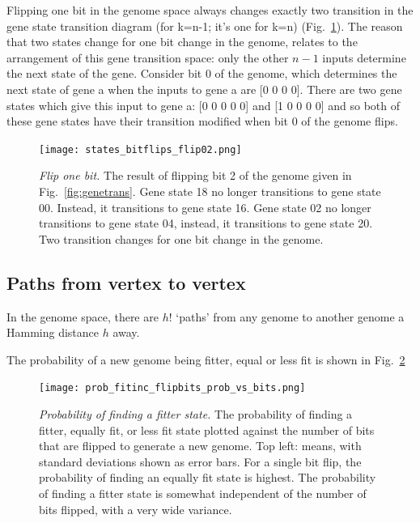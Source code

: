 \documentclass[11pt, a4paper]{article}
\begin{document}
Flipping one bit in the genome space always changes exactly two
transition in the gene state transition diagram (for k=n-1; it's one
for k=n) (Fig.~\ref{fig:genetrans2}). The reason that two states
change for one bit change in the genome, relates to the arrangement of
this gene transition space: only the other $n-1$ inputs determine the
next state of the gene. Consider bit 0 of the genome, which determines
the next state of gene a when the inputs to gene a are [0 0 0
0]. There are two gene states which give this input to gene a: [0 0 0
0 0] and [1 0 0 0 0] and so both of these gene states have their
transition modified when bit 0 of the genome flips.

\begin{figure}
\begin{center}
\texttt{[image: states\_bitflips\_flip02.png]}
\caption{\emph{Flip one bit.} The result of flipping bit 2 of the
genome given in Fig.~\ref{fig:genetrans}. Gene state 18 no longer
transitions to gene state 00. Instead, it transitions to gene state
16. Gene state 02 no longer transitions to gene state 04, instead, it
transitions to gene state 20. Two transition changes for one bit
change in the genome.}
\label{fig:genetrans2}
\end{center}
\end{figure}

\subsection{Paths from vertex to vertex}

In the genome space, there are $h!$ `paths' from any genome to another
genome a Hamming distance $h$ away.

The probability of a new genome being fitter, equal or less fit is
shown in Fig.~\ref{fig:prob_fitter}

\begin{figure}
\begin{center}
\texttt{[image: prob\_fitinc\_flipbits\_prob\_vs\_bits.png]}
\caption{\emph{Probability of finding a fitter state.}
The probability of finding a fitter, equally fit, or less fit state
plotted against the number of bits that are flipped to generate a new
genome. Top left: means, with standard deviations shown as error
bars. For a single bit flip, the probability of finding an equally fit
state is highest. The probability of finding a fitter state is
somewhat independent of the number of bits flipped, with a very wide variance.}
\label{fig:prob_fitter}
\end{center}
\end{figure}
\end{document}
